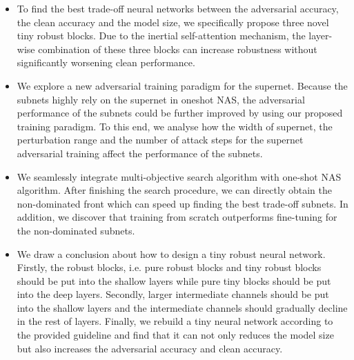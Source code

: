 \documentclass[journal]{IEEEtran}
\begin{document}
\begin{itemize}
\item To find the best trade-off neural networks between the adversarial accuracy, the clean accuracy and the model size, we specifically propose three novel tiny robust blocks. Due to the inertial self-attention mechanism, the layer-wise combination of these three blocks can increase robustness without significantly worsening clean performance.
\item We explore a new adversarial training paradigm for the supernet. Because the subnets highly rely on the supernet in oneshot NAS, the adversarial performance of the subnets could be further improved by using our proposed training paradigm. To this end, we analyse how the width of supernet, the perturbation range and the number of attack steps for the supernet adversarial training affect the performance of the subnets. 
\item We seamlessly integrate multi-objective search algorithm with one-shot NAS algorithm. After finishing the search procedure, we can directly obtain the non-dominated front which can speed up finding the best trade-off subnets. In addition, we discover that training from scratch outperforms fine-tuning for the non-dominated subnets.
\item We draw a conclusion about how to design a tiny robust neural network. Firstly, the robust blocks, i.e. pure robust blocks and tiny robust blocks should be put into the shallow layers while pure tiny blocks should be put into the deep layers. Secondly, larger intermediate channels should be put into the shallow layers and the intermediate channels should gradually decline in the rest of layers. Finally, we rebuild a tiny neural network according to the provided guideline and find that it can not only reduces the model size but also increases the adversarial accuracy and clean accuracy. 
\end{itemize}
\end{document}
